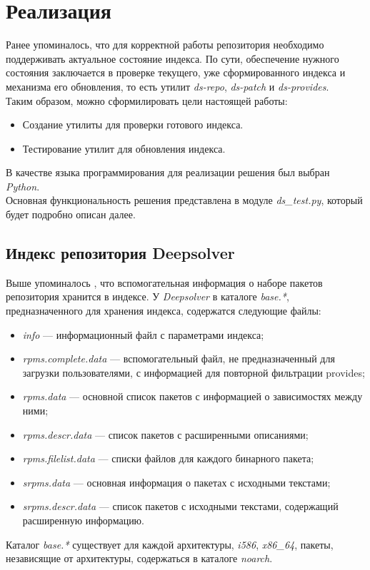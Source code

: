 \section{Реализация}
Ранее упоминалось, что для корректной работы репозитория необходимо
поддерживать актуальное состояние индекса. 
По сути, обеспечение нужного состояния заключается в проверке текущего,
уже сформированного индекса и механизма его обновления, то есть
утилит \textit{ds-repo}, \textit{ds-patch} и \textit{ds-provides}.\\

Таким образом, можно сформилировать цели настоящей работы:
\begin{itemize}
\item{Создание утилиты для проверки готового индекса.}
\item{Тестирование утилит для обновления индекса.}
\end{itemize}


В качестве языка программирования для реализации решения был выбран \textit{Python}.\\
Основная функциональность решения представлена в модуле \textit{ds\_test.py}, который
будет подробно описан далее.

\subsection{Индекс репозитория Deepsolver}
Выше упоминалось , что вспомогательная информация о наборе пакетов репозитория
хранится в индексе. У \textit{Deepsolver} в каталоге \textit{base.*}, предназначенного для хранения индекса,
содержатся следующие файлы:\\
\begin{itemize}
\item{\textit{info} --- информационный файл с параметрами индекса;} 
\item{\textit{rpms.complete.data} --- вспомогательный файл, не предназначенный
для загрузки пользователями, с информацией для повторной фильтрации
provides;}
\item{\textit{rpms.data} --- основной список пакетов с информацией о зависимостях между ними;}
\item{\textit{rpms.descr.data} --- список пакетов с расширенными описаниями;}
\item{\textit{rpms.filelist.data} --- списки файлов для каждого бинарного пакета;}
\item{\textit{srpms.data} --- основная информация о пакетах с исходными текстами;}
\item{\textit{srpms.descr.data} --- список пакетов с исходными текстами, содержащий
расширенную информацию.}
\end{itemize} 
Каталог  \textit{base.*} существует для каждой архитектуры, \textit{i586}, \textit{x86\_64}, пакеты,
независящие от архитектуры, содержаться в каталоге \textit{noarch}.\\

